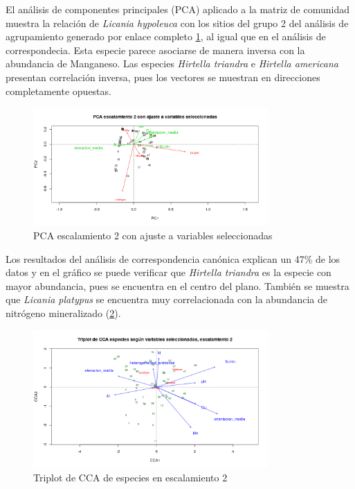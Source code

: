 \documentclass[11pt,]{article}
\begin{document}
El análisis de componentes principales (PCA) aplicado a la matriz de
comunidad muestra la relación de \emph{Licania hypoleuca} con los sitios
del grupo 2 del análisis de agrupamiento generado por enlace completo
\ref{pcaespecies}, al igual que en el análisis de correspondecia. Esta
especie parece asociarse de manera inversa con la abundancia de
Manganeso. Las especies \emph{Hirtella triandra} e \emph{Hirtella
americana} presentan correlación inversa, pues los vectores se muestran
en direcciones completamente opuestas.

\begin{figure}
\centering
\includegraphics[width=0.80000\textwidth]{PCA_especies.png}
\caption{PCA escalamiento 2 con ajuste a variables
seleccionadas\label{pcaespecies}}
\end{figure}

Los resultados del análisis de correspondencia canónica explican un 47\%
de los datos y en el gráfico se puede verificar que \emph{Hirtella
triandra} es la especie con mayor abundancia, pues se encuentra en el
centro del plano. También se muestra que \emph{Licania platypus} se
encuentra muy correlacionada con la abundancia de nitrógeno mineralizado
(\ref{triplotcca}).

\begin{figure}
\centering
\includegraphics[width=0.80000\textwidth]{triplotCCA.png}
\caption{Triplot de CCA de especies en escalamiento 2\label{triplotcca}}
\end{figure}
\end{document}

